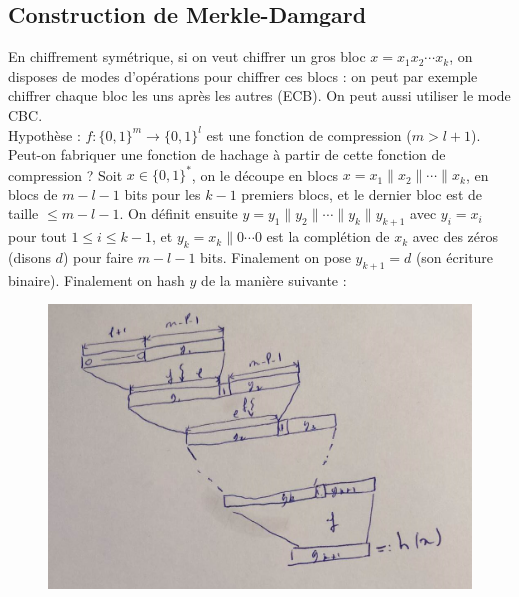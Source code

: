         \subsection{Construction de Merkle-Damgard}
            En chiffrement symétrique, si on veut chiffrer un gros bloc $x = x_1 x_2 \cdots x_k$, on disposes de modes d'opérations pour chiffrer ces blocs : on peut par exemple chiffrer chaque bloc les uns après les autres (ECB). On peut aussi utiliser le mode CBC. \\
            Hypothèse : $f : \{0,1\}^m \to \{0,1\}^l$ est une fonction de compression ($m > l + 1$). Peut-on fabriquer une fonction de hachage à partir de cette fonction de compression ? Soit $x \in \{0, 1\}^*$, on le découpe en blocs $x = x_1 \| x_2 \| \cdots \| x_k$, en blocs de $m - l - 1$ bits pour les $k - 1$ premiers blocs, et le dernier bloc est de taille $\leq m - l - 1$. On définit ensuite $y = y_1 \| y_2 \| \cdots \| y_k \| y_{k + 1}$ avec $y_i = x_i$ pour tout $1 \leq i \leq k - 1$, et $y_k = x_k \| 0 \cdots 0$ est la complétion de $x_k$ avec des zéros (disons $d$) pour faire $m - l - 1$ bits. Finalement on pose $y_{k + 1} = d$ (son écriture binaire). Finalement on hash $y$ de la manière suivante :
            
            \begin{figure}[H]
                \centering
                \includegraphics[width=.7\textwidth]{pictures/06}
            \end{figure} \noindent

